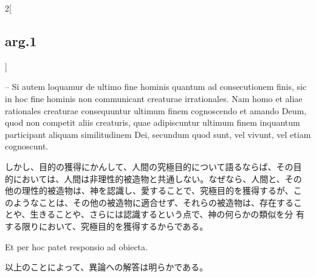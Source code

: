 \documentclass[paper=a4paper,fontsize=10pt,jafontsize=9pt,titlepage]{jlreq}
\begin{document}
\begin{paracol}{2}[\subsection{arg.1}]
\switchcolumn*

-- Si autem loquamur de ultimo fine hominis quantum ad consecutionem
finis, sic in hoc fine hominis non communicant creaturae
irrationales. Nam homo et aliae rationales creaturae consequuntur
ultimum finem cognoscendo et amando Deum, quod non competit aliis
creaturis, quae adipiscuntur ultimum finem inquantum participant aliquam
similitudinem Dei, secundum quod sunt, vel vivunt, vel etiam cognoscunt.

\switchcolumn

しかし、目的の獲得にかんして、人間の究極目的について語るならば、その目
 的においては、人間は非理性的被造物と共通しない。なぜなら、人間と、その
 他の理性的被造物は、神を認識し、愛することで、究極目的を獲得するが、こ
のようなことは、その他の被造物に適合せず、それらの被造物は、存在するこ
 とや、生きることや、さらには認識するという点で、神の何らかの類似を分
 有する限りにおいて、究極目的を獲得するからである。

\switchcolumn*

Et per hoc patet responsio ad obiecta.

\switchcolumn

以上のことによって、異論への解答は明らかである。

\end{paracol}
\end{document}
